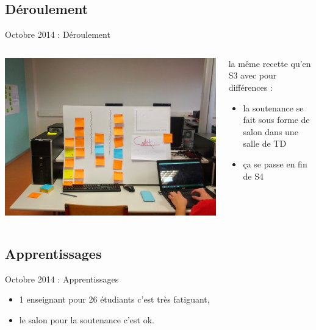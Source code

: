 \documentclass{beamer}
\begin{document}
\subsection{Déroulement}
\begin{frame}{Octobre 2014 : Déroulement }
  \begin{columns}
    \begin{column}{0.5\textwidth}
      \begin{center}
        \includegraphics[width=\textwidth]{includes/201410_dashboard.jpg}      
      \end{center}
    \end{column}
    \begin{column}{0.5\textwidth}
      la même recette qu'en S3 avec pour différences : 
      \begin{itemize}
        \item la soutenance se fait sous forme de salon dans une salle de TD
        \item ça se passe en fin de S4
      \end{itemize}
    \end{column}
  \end{columns}
\end{frame}

\subsection{Apprentissages}
\begin{frame}{Octobre 2014 : Apprentissages}
  \begin{itemize}
    \item 1 enseignant pour 26 étudiants c'est très fatiguant,
    \item le salon pour la soutenance c'est ok.
  \end{itemize}
\end{frame}
\end{document}
